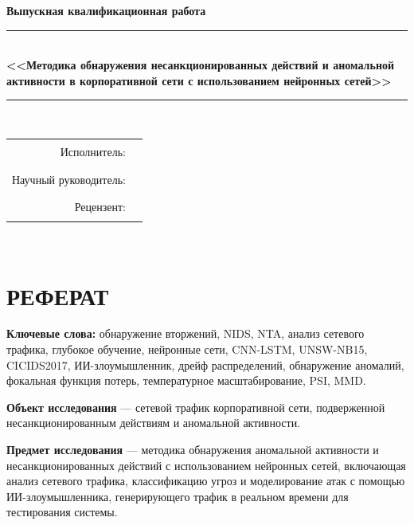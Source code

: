 \documentclass[14pt, a4paper]{extarticle}
\begin{document}
\begin{titlepage}
\centering
\vspace*{1cm}
{\large\bfseries Выпускная квалификационная работа}\\[0.3cm]
\rule{\linewidth}{0.4pt}\\[0.5cm]
{\Large\bfseries <<Методика обнаружения несанкционированных действий и
аномальной активности в корпоративной сети с использованием нейронных
сетей>>}\\[0.5cm]
\rule{\linewidth}{0.4pt}\\[3cm]

\begin{flushright}
\begin{tabular}{rl}
Исполнитель: & \rule{6cm}{0.4pt} \\[0.3cm]
Научный руководитель: & \rule{6cm}{0.4pt} \\[0.3cm]
Рецензент: & \rule{6cm}{0.4pt} \\
\end{tabular}
\end{flushright}

\vfill
{\large \the\year}\\
\end{titlepage}

\section*{РЕФЕРАТ}

\textbf{Ключевые слова:} обнаружение вторжений, NIDS, NTA, анализ сетевого
трафика, глубокое обучение, нейронные сети, CNN-LSTM, UNSW-NB15, CICIDS2017,
ИИ-злоумышленник, дрейф распределений, обнаружение аномалий, фокальная
функция потерь, температурное масштабирование, PSI, MMD.

\textbf{Объект исследования} --- сетевой трафик корпоративной сети,
подверженной несанкционированным действиям и аномальной активности.

\textbf{Предмет исследования} --- методика обнаружения аномальной активности
и несанкционированных действий с использованием нейронных сетей, включающая
анализ сетевого трафика, классификацию угроз и моделирование атак с помощью
ИИ-злоумышленника, генерирующего трафик в реальном времени для тестирования
системы.
\end{document}
